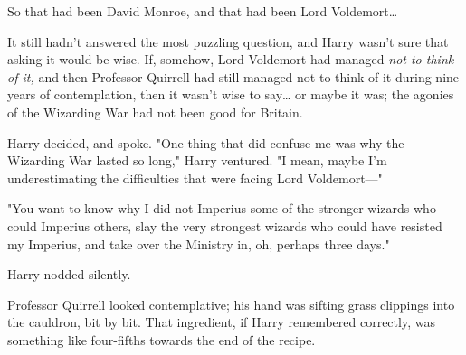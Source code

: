 So that had been David Monroe, and that had been Lord Voldemort{\ldots}

It still hadn't answered the most puzzling question, and Harry wasn't sure that 
asking it would be wise. If, somehow, Lord Voldemort had managed \emph{not to 
think of it,} and then Professor Quirrell had still managed not to think of it 
during nine years of contemplation, then it wasn't wise to say{\ldots} or maybe 
it was; the agonies of the Wizarding War had not been good for Britain.

Harry decided, and spoke. "One thing that did confuse me was why the Wizarding 
War lasted so long," Harry ventured. "I mean, maybe I'm underestimating the 
difficulties that were facing Lord Voldemort---"

"You want to know why I did not Imperius some of the stronger wizards who could 
Imperius others, slay the very strongest wizards who could have resisted my 
Imperius, and take over the Ministry in, oh, perhaps three days."

Harry nodded silently.

Professor Quirrell looked contemplative; his hand was sifting grass clippings 
into the cauldron, bit by bit. That ingredient, if Harry remembered correctly, 
was something like four-fifths towards the end of the recipe.


